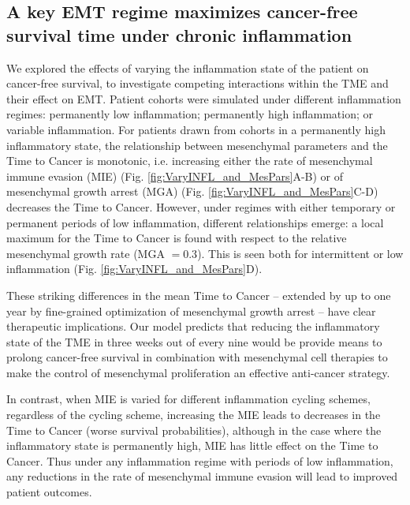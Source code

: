 \documentclass[11pt]{article}
\begin{document}
\subsection{A key EMT regime maximizes cancer-free survival time under chronic inflammation}\label{KeyEMT}

We explored the effects of varying the inflammation state of the patient on cancer-free survival, to investigate competing interactions within the TME and their effect on EMT. Patient cohorts were simulated under different inflammation regimes: permanently low inflammation; permanently high inflammation; or variable inflammation. For patients drawn from cohorts in a permanently high inflammatory state, the relationship between mesenchymal parameters and the Time to Cancer is monotonic, i.e. increasing either the rate of mesenchymal immune evasion (MIE) (Fig. \ref{fig:VaryINFL_and_MesPars}A-B) or of mesenchymal growth arrest (MGA)  (Fig. \ref{fig:VaryINFL_and_MesPars}C-D) decreases the Time to Cancer.
However, under regimes with either temporary or permanent periods of low inflammation, different relationships emerge: a local maximum for the Time to Cancer is found with respect to the relative mesenchymal growth rate (MGA $= 0.3$). This is seen both for intermittent or low inflammation (Fig. \ref{fig:VaryINFL_and_MesPars}D). 
\par
These striking differences in the mean Time to Cancer -- extended by up to one year by fine-grained optimization of mesenchymal growth arrest -- have clear therapeutic implications. 
Our model predicts that reducing the inflammatory state of the TME in three weeks out of every nine would be provide means to prolong cancer-free survival in combination with mesenchymal cell therapies to make the control of mesenchymal proliferation an effective anti-cancer strategy.
\par
In contrast, when MIE is varied for different inflammation cycling schemes, regardless of the cycling scheme, increasing the MIE leads to decreases in the Time to Cancer (worse survival probabilities), although in the case where the inflammatory state is permanently high, MIE has little effect on the Time to Cancer. Thus under any inflammation regime with periods of low inflammation, any reductions in the rate of mesenchymal immune evasion will lead to improved patient outcomes.
\end{document}

